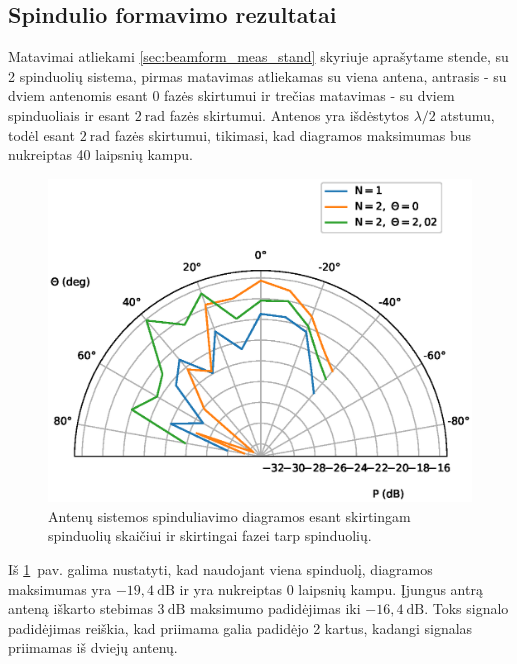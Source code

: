 \documentclass[main.tex]{subfiles}
\begin{document}
\subsection{Spindulio formavimo rezultatai}\label{sec:beam_form_results}

Matavimai atliekami \ref{sec:beamform_meas_stand} skyriuje aprašytame stende,
su 2 spinduolių sistema, pirmas matavimas atliekamas su viena
antena, antrasis - su dviem antenomis esant 0 fazės skirtumui ir trečias matavimas - su dviem
spinduoliais ir esant $2\ \mathrm{rad}$ fazės skirtumui. Antenos yra išdėstytos $\lambda / 2$ atstumu,
todėl esant $2\ \mathrm{rad}$ fazės skirtumui, tikimasi, kad diagramos maksimumas bus nukreiptas 40 laipsnių
kampu.

\begin{figure}[h]
    \begin{centering}
    \includegraphics[scale=0.8]{drawings/beam_forming_results}
    \par\end{centering}
    \protect\caption{\label{fig:beamforming_result}Antenų sistemos spinduliavimo diagramos esant skirtingam spinduolių skaičiui
    ir skirtingai fazei tarp spinduolių.}
\end{figure}

Iš \ref{fig:beamforming_result}~pav. galima nustatyti, kad naudojant viena spinduolį, diagramos maksimumas
yra $-19,4\ \mathrm{dB}$ ir yra nukreiptas 0 laipsnių kampu. Įjungus antrą anteną iškarto stebimas
$3\ \mathrm{dB}$ maksimumo padidėjimas iki $-16,4\ \mathrm{dB}$. Toks signalo padidėjimas reiškia,
kad priimama galia padidėjo 2 kartus, kadangi signalas priimamas iš dviejų antenų.
\end{document}
